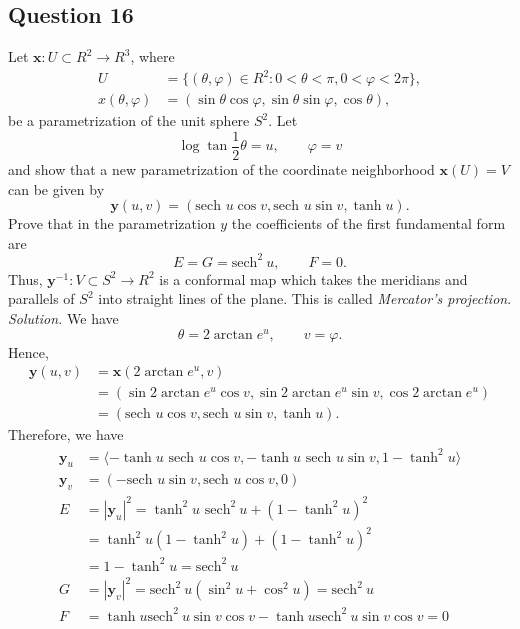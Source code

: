 \documentclass[12pt]{article}
\begin{document}
\subsection*{Question 16}
Let $\mathbf{x}:U \subset R^2 \to R^3$, where \begin{align*}
    U &=\{(\theta,\varphi)\in R^2:0<\theta<\pi,0<\varphi<2\pi\},\\
    x(\theta,\varphi) &= (\sin{\theta}\cos{\varphi},\sin{\theta}\sin{\varphi},\cos{\theta}),
\end{align*}
be a parametrization of the unit sphere $S^2$. Let\begin{equation*}
     \log\tan \frac{1}{2}\theta = u,\qquad \varphi = v
\end{equation*}
and show that a new parametrization of the coordinate neighborhood $\mathbf{x}(U)= V$ can be given by
\begin{equation*}
    \mathbf{y}(u,v) = (\text{sech } u\cos v,\text{sech } u\sin v,\tanh u).
\end{equation*}
Prove that in the parametrization $y$ the coefficients of the first fundamental form are \begin{equation*}
    E=G=\text{sech}^2~u,\qquad F=0.
\end{equation*}
Thus, $\mathbf{y}^{-1} : V \subset S^2 \to R^2$ is a conformal map which takes the meridians and
parallels of $S^2$ into straight lines of the plane. This is called \textit{Mercator's projection}.\\

\textit{Solution.} We have \begin{equation*}
    \theta = 2\arctan e^u, \qquad v = \varphi.
\end{equation*} Hence,\begin{align*}
    \mathbf{y}(u,v) &= \mathbf{x}(2\arctan e^u,v)\\
    &=(\sin{2\arctan e^u}\cos{v},\sin{2\arctan e^u}\sin{v},\cos{2\arctan e^u})\\
    &=(\text{sech }u\cos{v}, \text{sech }u\sin{v},\tanh u).
\end{align*}
Therefore, we have \begin{align*}
    \mathbf{y}_u &= \langle -\tanh u \text{ sech }u\cos v, -\tanh u \text{ sech }u\sin v, 1 - \tanh^2 u \rangle\\
    \mathbf{y}_v &= (-\text{sech }u\sin{v}, \text{sech }u\cos{v},0)\\
    E &= |\mathbf{y}_u|^2 = \tanh^2 u \text{ sech}^2~u + (1-\tanh^2 u)^2\\
    &= \tanh^2 u (1-\tanh^2 u) + (1-\tanh^2 u)^2\\
    &= 1-\tanh^2 u = \text{sech}^2~u\\
    G &= |\mathbf{y}_v|^2 = \text{sech}^2~u (\sin^2 u+\cos^2 u) = \text{sech}^2~u\\
    F &= \tanh u \text{sech}^2~u\sin v\cos v - \tanh u \text{sech}^2~u\sin v\cos v = 0
\end{align*}
\end{document}
